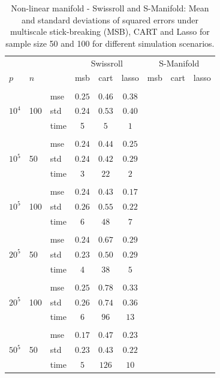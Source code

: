 \documentclass{article} %
\begin{document}
\begin{table}[t]
\caption{Non-linear manifold - Swissroll and S-Manifold: Mean and standard deviations of squared errors under multiscale stick-breaking (MSB), CART and Lasso for sample size 50 and 100 for different simulation scenarios.}\label{table:swiss}
\vskip 0.15in
\begin{center}
\begin{small}
\begin{sc}
\begin{tabular}{lllcccccc}
\hline
&&&\multicolumn{3}{c}{Swissroll}&\multicolumn{3}{c}{S-Manifold}\\

$p$&$n$& & msb&cart& lasso & msb&cart& lasso\\
\\
\multirow{3}{*}{$10^4$}&\multirow{3}{*}{100}&mse &$0.25$&$0.46$&$0.38$\\
&&std & $0.24$ & $0.53$&$0.40$\\
&&time & 5& $5$&$1$ \\

\\
\multirow{3}{*}{$10^5$}&\multirow{3}{*}{50}&mse &$0.24$&$0.44$&$0.25$\\
&&std & $0.24$ & $0.42$&$0.29$\\
&&time & 3 & $22$&$2$ \\

\\
\multirow{3}{*}{$10^5$}&\multirow{3}{*}{100}&mse &$0.24$ & $0.43$&$0.17$\\
&&std & $0.26$&$0.55$&$0.22$\\
&&time&$6$&$48$&$7$\\
\\

\multirow{3}{*}{$20^5$}&\multirow{3}{*}{50}&mse &$0.24$&$0.67$&$0.29$\\
&&std & $0.23$ & $0.50$& $0.29$\\
&&time & 4& $38$& $5$ \\
\\
\multirow{3}{*}{$20^5$}&\multirow{3}{*}{100}&mse &$0.25$&$0.78$&$0.33$\\
&&std & $0.26$ & $0.74$&$0.36$\\
&&time &6 &$96$&$13$ \\
\\

\multirow{3}{*}{$50^5$}&\multirow{3}{*}{50}&mse &$0.17$&$0.47$&$0.23$\\
&&std & $0.23$ & $0.43$&$0.22$\\
&&time &$5$ &$126$&$10$ \\


\end{tabular}
\end{sc}
\end{small}
\end{center}
\end{table}
\end{document}
